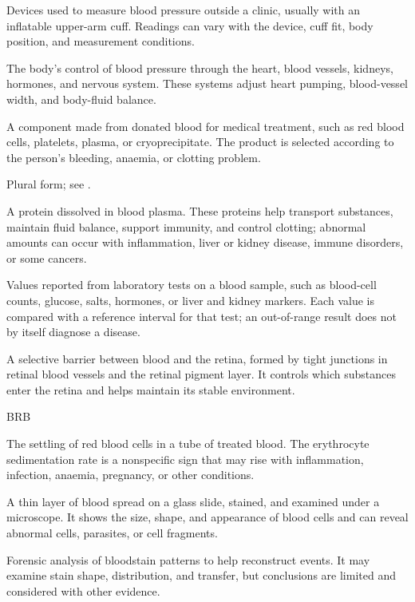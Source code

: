  Devices used to measure blood pressure outside a clinic, usually with an inflatable upper-arm cuff. Readings can vary with the device, cuff fit, body position, and measurement conditions.

 The body’s control of blood pressure through the heart, blood vessels, kidneys, hormones, and nervous system. These systems adjust heart pumping, blood-vessel width, and body-fluid balance.

 A component made from donated blood for medical treatment, such as red blood cells, platelets, plasma, or cryoprecipitate. The product is selected according to the person's bleeding, anaemia, or clotting problem.

 Plural form; see .

 A protein dissolved in blood plasma. These proteins help transport substances, maintain fluid balance, support immunity, and control clotting; abnormal amounts can occur with inflammation, liver or kidney disease, immune disorders, or some cancers.

 Values reported from laboratory tests on a blood sample, such as blood-cell counts, glucose, salts, hormones, or liver and kidney markers. Each value is compared with a reference interval for that test; an out-of-range result does not by itself diagnose a disease.

 A selective barrier between blood and the retina, formed by tight junctions in retinal blood vessels and the retinal pigment layer. It controls which substances enter the retina and helps maintain its stable environment.

\synonyms
BRB

 The settling of red blood cells in a tube of treated blood. The erythrocyte sedimentation rate is a nonspecific sign that may rise with inflammation, infection, anaemia, pregnancy, or other conditions.

 A thin layer of blood spread on a glass slide, stained, and examined under a microscope. It shows the size, shape, and appearance of blood cells and can reveal abnormal cells, parasites, or cell fragments.

 Forensic analysis of bloodstain patterns to help reconstruct events. It may examine stain shape, distribution, and transfer, but conclusions are limited and considered with other evidence.

